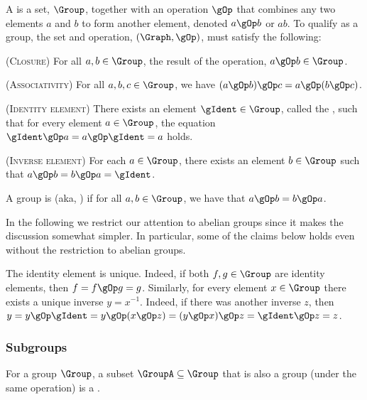 \begin{defn}
    A  is a set, $\Group$, together with an operation
    $\gOp$ that combines any two elements $a$ and $b$ to form another
    element, denoted $a \gOp b$ or $ab$. To qualify as a group, the
    set and operation, $(\Graph, \gOp)$, must satisfy the following:
    \smallskip%
    \begin{compactenumA}
        \item (\textsc{Closure}) For all $a, b \in \Group$, the result
        of the operation, $a \gOp b \in \Group$.

        \item (\textsc{Associativity}) For all $a, b, c \in \Group$,
        we have $(a \gOp b) \gOp c = a \gOp (b \gOp c)$.

        \item (\textsc{Identity element}) There exists an
        element $\gIdent \in \Group$, called the ,
        such that for every element $a \in \Group$, the equation $\gIdent
        \gOp a = a \gOp \gIdent = a$ holds.

        \item (\textsc{Inverse element}) For each $a \in \Group$,
        there exists an element $b \in \Group$ such that $a \gOp b = b
        \gOp a = \gIdent$.
    \end{compactenumA}
    \smallskip%
    A group is  (aka, ) if for
    all $a,b \in \Group$, we have that $a \gOp b = b \gOp a$.
\end{defn}

In the following we restrict our attention to abelian groups since it
makes the discussion somewhat simpler. In particular, some of the
claims below holds even without the restriction to abelian groups.

The identity element is unique. Indeed, if both $f, g \in \Group$ are
identity elements, then $f = f \gOp g = g$. Similarly, for every
element $x \in \Group$ there exists a unique inverse $y =
x^{-1}$. Indeed, if there was another inverse $z$, then $y = y \gOp
\gIdent = y \gOp (x\gOp z) = (y\gOp x)\gOp z = \gIdent \gOp z = z$.

\subsubsection{Subgroups}

For a group $\Group$, a subset $\GroupA \subseteq \Group$ that is also
a group (under the same operation) is a .

